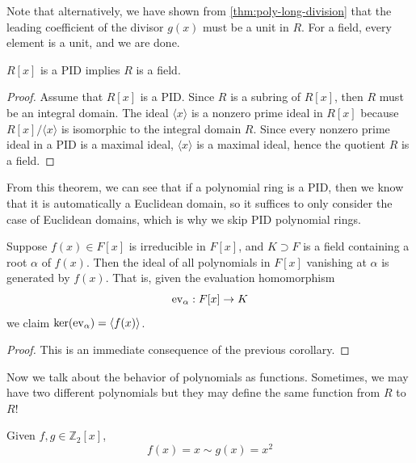   Note that alternatively, we have shown from \ref{thm:poly-long-division} that the leading coefficient of the divisor $g(x)$ must be a unit in $R$. For a field, every element is a unit, and we are done. 

  \begin{theorem}
    $R[x]$ is a PID implies $R$ is a field.
  \end{theorem}
  \begin{proof}
    Assume that $R[x]$ is a PID. Since $R$ is a subring of $R[x]$, then $R$ must be an integral domain. The ideal $\langle x \rangle$ is a nonzero prime ideal in $R[x]$ because $R[x]/\langle x \rangle$ is isomorphic to the integral domain $R$. Since every nonzero prime ideal in a PID is a maximal ideal, $\langle x \rangle$ is a maximal ideal, hence the quotient $R$ is a field. 
  \end{proof} 

  From this theorem, we can see that if a polynomial ring is a PID, then we know that it is automatically a Euclidean domain, so it suffices to only consider the case of Euclidean domains, which is why we skip PID polynomial rings. 

  \begin{theorem}
    Suppose $f(x) \in F[x]$ is irreducible in $F[x]$, and $K \supset F$ is a field containing a root $\alpha$ of $f(x)$. Then the ideal of all polynomials in $F[x]$ vanishing at $\alpha$ is generated by $f(x)$. That is, given the evaluation homomorphism 
    \begin{equation}
      \operatorname{ev}_\alpha: F[x] \rightarrow K
    \end{equation}
    we claim $\ker(\operatorname{ev}_\alpha) = \langle f(x) \rangle$. 
  \end{theorem}
  \begin{proof}
    This is an immediate consequence of the previous corollary. 
  \end{proof}

  Now we talk about the behavior of polynomials as functions. Sometimes, we may have two different polynomials but they may define the same function from $R$ to $R$! 

  \begin{example}
    Given $f, g \in \mathbb{Z}_2 [x]$, 
    \begin{equation}
      f(x) = x \sim g(x) = x^2
    \end{equation} 
  \end{example} 

